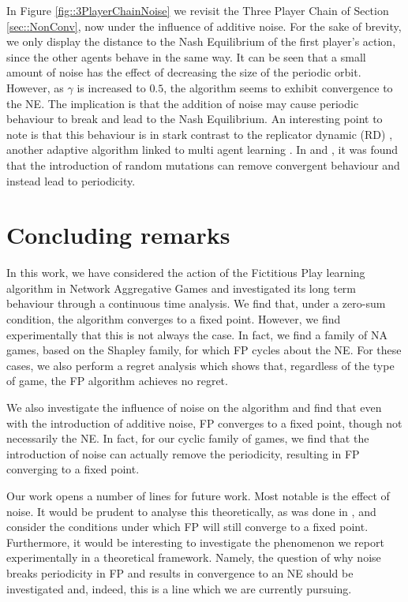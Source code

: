 \documentclass{article}
\theoremstyle{definition}
\begin{document}
  In Figure \ref{fig::3PlayerChainNoise} we revisit the Three Player Chain of Section
  \ref{sec::NonConv}, now under the influence of additive noise. For the sake of brevity, we only
  display the distance to the Nash Equilibrium of the first player's action, since the other agents
  behave in the same way. It can be seen that a small amount of noise has the effect of decreasing
  the size of the periodic orbit. However, as $\gamma$
  is increased to $0.5$, the algorithm seems to exhibit convergence to the NE. The implication is
  that the addition of noise may cause periodic behaviour to break and lead to the Nash Equilibrium.
  An interesting point to note is that this behaviour is in stark contrast to the replicator
  dynamic (RD) \cite{Maynard-Smith}, another adaptive algorithm linked to multi agent learning
  \cite{CyclesAdversarialLearning}. In \cite{Imhof} and \cite{Galla}, it was found that the
  introduction of random mutations can remove convergent behaviour and instead lead to periodicity. 
  
\section{Concluding remarks}
	In this work, we have considered the action of the Fictitious Play learning algorithm in Network Aggregative Games and investigated its long term behaviour through a continuous time analysis. We find that, under a zero-sum condition, the algorithm converges to a fixed point. However, we find experimentally that this is not always the case. In fact, we find a family of NA games, based on the Shapley family, for which FP cycles about the NE. For these cases, we also perform a regret analysis which shows that, regardless of the type of game, the FP algorithm achieves no regret. 
	
	We also investigate the influence of noise on the algorithm and find that even with the introduction of additive noise, FP converges to a fixed point, though not necessarily the NE. In fact, for our cyclic family of games, we find that the introduction of noise can actually remove the periodicity, resulting in FP converging to a fixed point.
	
	Our work opens a number of lines for future work. Most notable is the effect of noise. It would be prudent to analyse this theoretically, as was done in \cite{MFGFP}, and consider the conditions under which FP will still converge to a fixed point. Furthermore, it would be interesting to investigate the phenomenon we report experimentally in a theoretical framework. Namely, the question of why noise breaks periodicity in FP and results in convergence to an NE should be investigated and, indeed, this is a line which we are currently pursuing.
	
\end{document}
